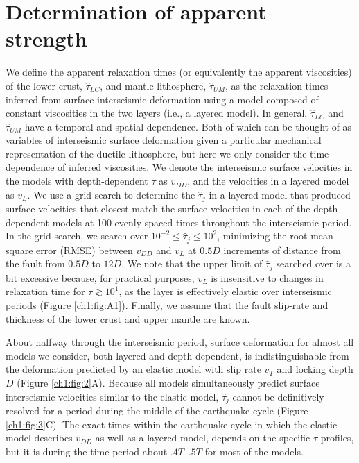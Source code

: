 \section{Determination of apparent strength}
We define the apparent relaxation times (or equivalently the apparent
viscosities) of the lower crust, $\hat{\tau}_{LC}$, and mantle
lithosphere, $\hat{\tau}_{UM}$, as the relaxation times inferred from
surface interseismic deformation using a model composed of constant
viscosities in the two layers (i.e., a layered model). In
general, $\hat{\tau}_{LC}$ and $\hat{\tau}_{UM}$ have a temporal
\citep{Riva2009} and spatial \citep{Yamasaki2012} dependence.  Both of
which can be thought of as variables of interseismic surface
deformation given a particular mechanical representation of the
ductile lithosphere, but here we only consider the time dependence of
inferred viscosities.  We denote the interseismic surface velocities
in the models with depth-dependent $\tau$ as $v_{DD}$, and the
velocities in a layered model as $v_{L}$.  We use a grid search to
determine the $\hat{\tau}_j$ in a layered model that produced surface
velocities that closest match the surface velocities in each of the
depth-dependent models at 100 evenly spaced times throughout the
interseismic period.  In the grid search, we search over $10^{-2} \leq
\hat{\tau}_j \leq 10^2$, minimizing the root mean square error (RMSE)
between $v_{DD}$ and $v_L$ at $0.5D$ increments of distance from the
fault from $0.5D$ to $12D$\@.  We note that the upper limit of
$\hat{\tau}_j$ searched over is a bit excessive because, for practical
purposes, $v_{L}$ is insensitive to changes in relaxation time for
$\tau \gtrsim 10^1$, as the layer is effectively elastic over
interseismic periods \citep{Savage1978} (Figure \ref{ch1:fig:A1}).
Finally, we assume that the fault slip-rate and thickness of the lower
crust and upper mantle are known.

About halfway through the interseismic period, surface deformation for
almost all models we consider, both layered and depth-dependent, is
indistinguishable from the deformation predicted by an elastic model
with slip rate $v_T$ and locking depth $D$ \citep{Savage1973a} (Figure
\ref{ch1:fig:2}A). Because all models simultaneously predict surface
interseismic velocities similar to the elastic model, $\hat{\tau}_j$
cannot be definitively resolved for a period during the middle of the
earthquake cycle (Figure \ref{ch1:fig:3}C). The exact times within the
earthquake cycle in which the elastic model describes $v_{DD}$ as well
as a layered model, depends on the specific $\tau$ profiles, but it is
during the time period about $.4T$--$.5T$ for most of the models.

